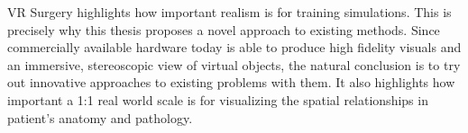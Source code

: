 VR Surgery highlights how important realism is for training simulations.
This is precisely why this thesis proposes a novel approach to existing methods.
Since commercially available hardware today is able to produce high fidelity visuals and an immersive, stereoscopic view of virtual objects,
the natural conclusion is to try out innovative approaches to existing problems with them.
It also highlights how important a 1:1 real world scale is for visualizing the spatial relationships in patient's anatomy and pathology.




